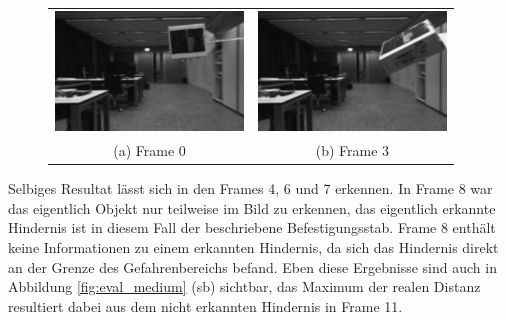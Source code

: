 		\begin{figure}[h]
			\centering
			\begin{tabular}{cc}
			\includegraphics[width=5cm]{img/evaluation/medium_0_left}&
			\includegraphics[width=5cm]{img/evaluation/medium_3_left}\\
			(a) Frame 0 &  (b) Frame 3
			\end{tabular}
			\caption{}
		    \label{fig:eval_medium_fails}
		\end{figure}
	
	\noindent
	Selbiges Resultat lässt sich in den Frames 4, 6 und 7 erkennen. In Frame 8 war das eigentlich Objekt nur teilweise im Bild zu erkennen, das eigentlich erkannte Hindernis ist in diesem Fall der beschriebene Befestigungsstab. Frame 8 enthält keine Informationen zu einem erkannten Hindernis, da sich das Hindernis direkt an der Grenze des Gefahrenbereichs befand.	Eben diese Ergebnisse sind auch in Abbildung \ref{fig:eval_medium} (sb) sichtbar, das Maximum der realen Distanz resultiert dabei aus dem nicht erkannten Hindernis in Frame 11.\\
	
